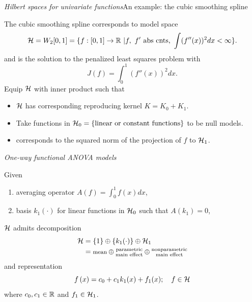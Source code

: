 \begin{frame}{\textit{Hilbert spaces for univariate functions}}{An example: the cubic smoothing spline}
\begin{small}
The cubic smoothing spline corresponds to model space
\begin{equation*}
\mathcal{H} = W_2[0,1]=\{f:[0,1]\rightarrow \Bbb{R}~| f, ~f' \mbox{ abs cnts, } \int (f''(x))^2 dx<\infty\}.
\end{equation*}
and is the solution to the penalized least squares problem with
\begin{equation*}
J(f)=\int_0^1 (f''(x))^2 dx.
\end{equation*}
Equip $\mathcal{H}$ with inner product such that 
\begin{itemize}
\item $\mathcal{H}$ has corresponding reproducing kernel $K = K_0 + K_1$.
\item Take functions in  $\mathcal{H}_0 = \lbrace \mbox{linear or constant functions} \rbrace$ to be null models.
\item {} corresponds to the squared norm of the projection of $f$ to $\mathcal{H}_1$. 
\end{itemize}
\end{small}
\end{frame}

\begin{frame}{\textit{One-way functional ANOVA models}}{}
\begin{small}
Given
\begin{enumerate}
\item averaging operator $A(f)=\int_0^1 f(x) dx$,
\item basis $k_1(\cdot)$ for linear functions in $\mathcal{H}_0$ such that $A(k_1) = 0$, 
\end{enumerate}
$\mathcal{H}$ admits decomposition
\begin{align*}
\mathcal{H} &=  {\{1\}}  \oplus  \{k_1(\cdot)\} \oplus {\mathcal{H}_1} \\
&= \text{\footnotesize{mean}} \oplus {\substack{\text{parametric} \\ \text{main effect}}} \oplus {\substack{\text{nonparametric} \\ \text{main effect}}}
\end{align*}
and representation
\begin{equation*}
f\left(x\right) = c_0+c_1k_1(x)+f_1(x); \quad f \in \mathcal{H}
\end{equation*}
where $c_0, c_1 \in \Bbb{R}$ and $f_1\in \mathcal{H}_1$.
\end{small}
\end{frame}


